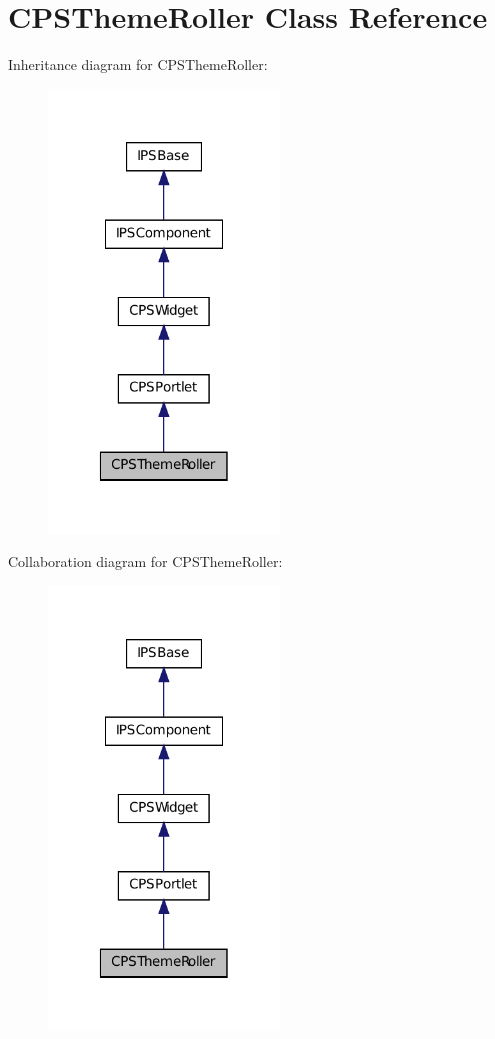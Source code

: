 \hypertarget{classCPSThemeRoller}{
\section{CPSThemeRoller Class Reference}
\label{classCPSThemeRoller}
}


Inheritance diagram for CPSThemeRoller:\nopagebreak
\begin{figure}[H]
\begin{center}
\leavevmode
\includegraphics[width=174pt]{classCPSThemeRoller__inherit__graph}
\end{center}
\end{figure}


Collaboration diagram for CPSThemeRoller:\nopagebreak
\begin{figure}[H]
\begin{center}
\leavevmode
\includegraphics[width=174pt]{classCPSThemeRoller__coll__graph}
\end{center}
\end{figure}
